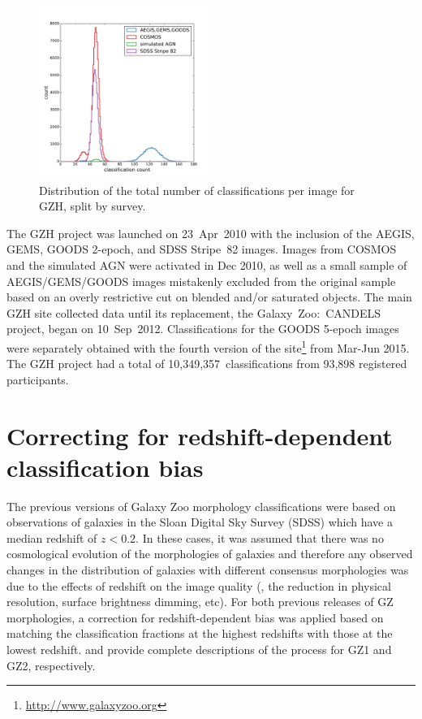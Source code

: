 \documentclass[twocolumn]{aastex6}
\begin{document}
\begin{figure}
\center
\includegraphics[width=0.5\textwidth]{figures/classification_hist.pdf}
\caption{Distribution of the total number of classifications per image for GZH, split by survey.}
\label{fig:classification_hist}
\end{figure}

The GZH project was launched on 23~Apr~2010 with the inclusion of the AEGIS, GEMS, GOODS 2-epoch, and SDSS Stripe~82 images. Images from COSMOS and the simulated AGN were activated in Dec 2010, as well as a small sample of AEGIS/GEMS/GOODS images mistakenly excluded from the original sample based on an overly restrictive cut on blended and/or saturated objects. The main GZH site collected data until its replacement, the Galaxy~Zoo:~CANDELS project, began on 10~Sep~2012. Classifications for the GOODS 5-epoch images were separately obtained with the fourth version of the site\footnote{\url{http://www.galaxyzoo.org}} from Mar-Jun 2015. The GZH project had a total of 10,349,357~classifications from 93,898 registered participants. %

\section{Correcting for redshift-dependent classification bias}\label{sec:debiasing}

The previous versions of Galaxy Zoo morphology classifications \citep{lin08,wil13} were based on observations of galaxies in the Sloan Digital Sky Survey (SDSS) which have a median redshift of $z<0.2$. In these cases, it was assumed that there was no cosmological evolution of the morphologies of galaxies and therefore any observed changes in the distribution of galaxies with different consensus morphologies was due to the effects of redshift on the image quality (\ie, the reduction in physical resolution, surface brightness dimming, etc). For both previous releases of GZ morphologies, a correction for redshift-dependent bias was applied based on matching the classification fractions at the highest redshifts with those at the lowest redshift. \citet{bam09} and \citet{wil13} provide complete descriptions of the process for GZ1 and GZ2, respectively.
\end{document}
